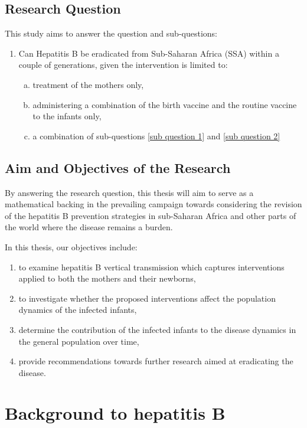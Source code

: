 \subsection{Research Question}
\label{section: research questions}
This study aims to answer the question and sub-questions: 
\begin{enumerate}[1.]
	\item Can Hepatitis B be eradicated from Sub-Saharan Africa (SSA) within a couple of generations, given the intervention is limited to: 
	\begin{enumerate} [(a)]
		\item treatment of the mothers only,  \label{sub question 1}
		\item administering a combination of the birth vaccine and the routine vaccine to the infants only, \label{sub question 2}
		\item a combination of sub-questions \ref{sub question 1} and \ref{sub question 2}
	\end{enumerate}
\end{enumerate}

\subsection{Aim and Objectives of the Research}
By answering the research question, this thesis will aim to serve as a mathematical backing in the prevailing campaign towards considering the revision of the hepatitis B prevention strategies in sub-Saharan Africa and other parts of the world where the disease remains a burden.  

In this thesis, our objectives include:
\begin{enumerate}
	\item to examine hepatitis B vertical transmission which captures interventions applied to both the mothers and their newborns,
	\item to investigate whether the proposed interventions affect the population dynamics of the infected infants,
	\item determine the contribution of the infected infants to the disease dynamics in the general population over time,
	\item provide recommendations towards further research aimed at eradicating the disease.
	
\end{enumerate}

\section{Background to hepatitis B} 
